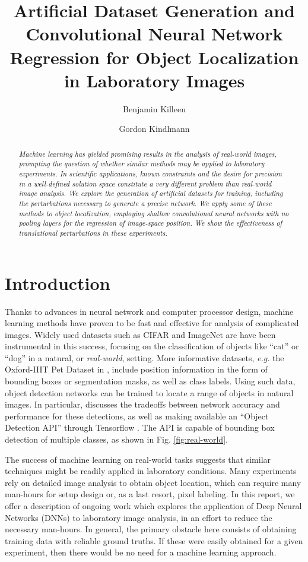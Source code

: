 \documentclass[twocolumn, 10pt]{asme2ej}
\title{Artificial Dataset Generation and Convolutional Neural Network Regression
  for Object Localization in Laboratory Images}
\author{Benjamin Killeen
  \affiliation{
    Undergraduate \\
    Department of Computer Science \\
    University of Chicago \\
    \href{mailto:killeen@uchicago.edu}{killeen@uchicago.edu}
  }
}
\author{Gordon Kindlmann \affiliation{
    Associate Professor \\
    Department of Computer Science \\
    University of Chicago \\
    \href{mailto:glk@uchicago.edu}{glk@uchicago.edu}
  }
}
\begin{document}
\maketitle

\begin{abstract}
  {\it Machine learning has yielded promising results in the analysis of
    real-world images, prompting the question of whether similar methods may be
    applied to laboratory experiments. In scientific applications, known
    constraints and the desire for precision in a well-defined solution space
    constitute a very different problem than real-world image analysis. We
    explore the generation of artificial datasets for training, including the
    perturbations necessary to generate a precise network. We apply some of
    these methods to object localization, employing shallow convolutional neural
    networks with no pooling layers for the regression of image-space
    position. We show the effectiveness of translational perturbations in these
    experiments.}
\end{abstract}

\section{Introduction}
\label{sec:introduction}

Thanks to advances in neural network and computer processor design, machine
learning methods have proven to be fast and effective for analysis of
complicated images. Widely used datasets such as CIFAR and ImageNet are have
been instrumental in this success, focusing on the classification of objects
like ``cat'' or ``dog'' in a natural, or \emph{real-world}, setting. More
informative datasets, \emph{e.g.} the Oxford-IIIT Pet Dataset in
\cite{parkhi_cats_2012}, include position information in the form of bounding
boxes or segmentation masks, as well as class labels. Using such data, object
detection networks can be trained to locate a range of objects in natural
images. In particular, \cite{huang_speed/accuracy_2016} discusses the tradeoffs
between network accuracy and performance for these detections, as well as making
available an ``Object Detection API'' through Tensorflow
\cite{martin_abadi_tensorflow:_2015}. The API is capable of bounding box
detection of multiple classes, as shown in Fig. \ref{fig:real-world}.

The success of machine learning on real-world tasks suggests that similar
techniques might be readily applied in laboratory conditions. Many experiments
rely on detailed image analysis to obtain object location, which can require
many man-hours for setup design or, as a last resort, pixel labeling. In this
report, we offer a description of ongoing work which explores the application of
Deep Neural Networks (DNNs) to laboratory image analysis, in an effort to reduce
the necessary man-hours. In general, the primary obstacle here consists of
obtaining training data with reliable ground truths. If these were easily
obtained for a given experiment, then there would be no need for a machine
learning approach.
\end{document}
